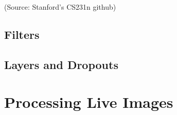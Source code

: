 \documentclass[a4paper,english]{report}
\begin{document}
    	(Source: Stanford's CS231n github)
    	
        \section{Filters}
        \section{Layers and Dropouts}
        \chapter{Processing Live Images}
    
\end{document}
